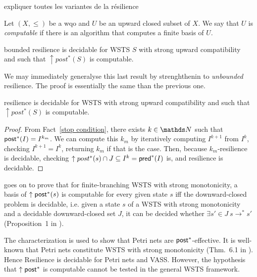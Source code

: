 expliquer toutes les variantes de la résilience


Let $(X,\leq)$ be a wqo and $U$ be an upward closed subset of $X$. We say that $U$ is \emph{computable} if there is an algorithm that computes a finite basis of $U$.


\begin{theorem}\cite{DBLP:conf/gg/Ozkan22,DBLP:journals/corr/abs-2108-00889}
{\sc bounded resilience} is decidable for WSTS $S$ with strong upward compatibility and such that $\uparrow post^*(S)$ is computable.
\end{theorem}

We may immediately generalyse this last result by strenghthenin to \emph{unbounded} resilience. The proof is essentially the same than the previous one.

\begin{corollary}\label{postcomputable}
{\sc resilience} is decidable for WSTS with strong upward compatibility and such that $\uparrow post^*(S)$ is computable.
\end{corollary}


\begin{proof}
From Fact~\ref{stop condition}, there exists $k \in \N$ such that
$\textsf{post}^*(I) = I^{k_m}$. We can compute this $k_m$ by iteratively computing
$I^{k+1}$ from $I^k$, checking $I^{k+1}=I^k$, 
returning $k_m$ if that is the case.
Then, because $k_m$-resilience is decidable, 
checking $\uparrow post^*(s) \cap J \subseteq I^k = \textsf{pred}^*(I)$ is,
and resilience is decidable.
\end{proof}

\begin{proposition} \cite{DBLP:conf/gg/Ozkan22}
goes on to prove that for finite-branching WSTS with strong monotonicity, a basis of $\uparrow \textsf{post}^*(s)$ is computable for every given state $s$ iff the downward-closed problem is decidable, i.e. given a state $s$ of a WSTS
with strong monotonicity 
and a decidable downward-closed set $J$, it can be decided whether $\exists s' \in J ~ s \to^* s'$ (Proposition~1 in \cite{DBLP:conf/gg/Ozkan22}). 
\end{proposition}

The characterization is used to show that Petri nets are $\textsf{post}^*$-effective. It is well-known that Petri nets constitute WSTS with strong monotonicity (Thm.~6.1 in \cite{DBLP:journals/tcs/FinkelS01}). Hence Resilience is decidable for Petri nets and VASS.
However, the hypothesis that $\uparrow \textsf{post}^*$ is computable cannot be tested in the general WSTS framework.


